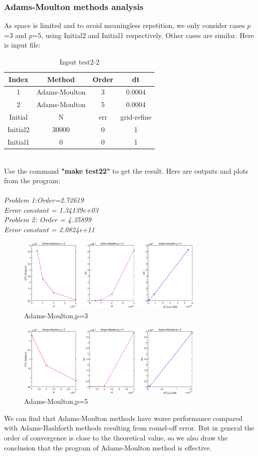 \documentclass[a4paper,twocolumn]{article}
\theoremstyle{definition}
\begin{document}
\subsubsection{Adams-Moulton methods analysis}
As space is limited and to avoid meaningless repetition, we only consider cases $p$=3 and $p$=5, using Initial2 and Initial1  respectively. Other cases are similar. Here is input file:
\begin{table}[!htp]
	\centering
	\begin{tabular}{|c|c|c|c|}
		\hline	
		Index & Method & Order & dt \\
		\hline		
		1 & Adams-Moulton & 3 & 0.0004   \\	
		\hline		
		2 & Adams-Moulton & 5 & 0.0004   \\	
		\hline \hline
		Initial & N & err & grid-refine \\
		\hline
		Initial2 & 30000 & 0 & 1 \\
		\hline
		Initial1 & 0 & 0 & 1 \\
		\hline
	\end{tabular}
	\caption{Input test2-2}
	\label{tab:test22}
\end{table}\\
Use the command \textbf{"make test22"} to get the result. Here are outputs and plots from the program:\\\\
\emph{Problem 1:Order=2.72619}\\
\emph{Error constant = 1.34139e+03}\\
\emph{Problem 2: Order = 4.35899}\\
\emph{Error constant = 2.0824e+11}

\begin{figure}[!htp]   
	\centering
	\includegraphics[width=9cm]{Pictures/2_2_1.eps}
	\caption{Adams-Moulton,p=3}
	\label{fig:AM3gf}
\end{figure}
\begin{figure}[!htp]   
	\centering
	\includegraphics[width=9cm]{Pictures/2_2_2.eps}
	\caption{Adams-Moulton,p=5}
	\label{fig:AM5gf}
\end{figure}
\noindent We can find that Adams-Moulton methods have worse performance compared with Adams-Bashforth methods resulting from round-off error. But in general the order of convergence is close to the theoretical value, so we also draw the conclusion that the program of Adams-Moulton method is effective. 
\end{document}
